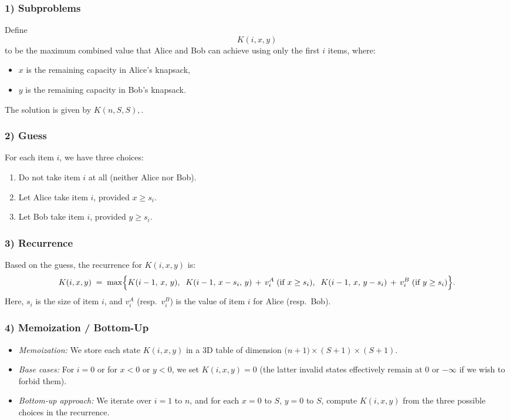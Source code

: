\documentclass[11pt]{article}
\begin{document}
    \subsubsection*{1) Subproblems}
    
    Define 
    \[
    K(i, x, y)
    \]
    to be the maximum combined value that Alice and Bob can achieve using only the first \(i\) items, where:
    \begin{itemize}
        \item \(x\) is the remaining capacity in Alice's knapsack,
        \item \(y\) is the remaining capacity in Bob's knapsack.
    \end{itemize}
    The solution is given by \( K(n, S, S),\).
    
    \subsubsection*{2) Guess}
    
    For each item \(i\), we have three choices:
    \begin{enumerate}
        \item Do not take item \(i\) at all (neither Alice nor Bob).
        \item Let Alice take item \(i\), provided \(x \ge s_i\).
        \item Let Bob take item \(i\), provided \(y \ge s_i\).
    \end{enumerate}
    
    \subsubsection*{3) Recurrence}
    
    Based on the guess, the recurrence for \(K(i,x,y)\) is:
    \[
    K(i,x,y) \;=\; \max\Bigl\{
        K(i-1,\,x,\,y),\;\;
        K(i-1,\,x - s_i,\,y) \,+\, v_i^A \;\text{(if } x \ge s_i),\;\;
        K(i-1,\,x,\,y - s_i) \,+\, v_i^B \;\text{(if } y \ge s_i)
    \Bigr\}.
    \]
    Here, \(s_i\) is the size of item \(i\), and \(v_i^A\) (resp.\ \(v_i^B\)) is the value of item \(i\) for Alice (resp.\ Bob).
    
    \subsubsection*{4) Memoization / Bottom-Up}
    
    \begin{itemize}
        \item \emph{Memoization:} We store each state \(K(i,x,y)\) in a 3D table of dimension \(\bigl(n+1\bigr) \times (S+1) \times (S+1)\). 
        \item \emph{Base cases:} For \(i=0\) or for \(x<0\) or \(y<0\), we set \(K(i,x,y)=0\) (the latter invalid states effectively remain at 0 or \(-\infty\) if we wish to forbid them).
        \item \emph{Bottom-up approach:} We iterate over \(i=1\) to \(n\), and for each \(x=0\) to \(S\), \(y=0\) to \(S\), compute \(K(i,x,y)\) from the three possible choices in the recurrence.
    \end{itemize}
    
\end{document}
